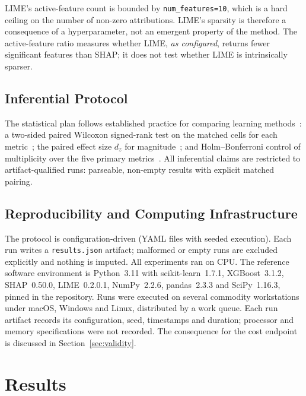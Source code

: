 \documentclass[11pt,a4paper]{article}
\begin{document}
LIME's active-feature count is bounded by \texttt{num\_features=10}, which
is a hard ceiling on the number of non-zero attributions. LIME's sparsity
is therefore a consequence of a hyperparameter, not an emergent property of
the method. The active-feature ratio measures whether LIME, \emph{as
configured}, returns fewer significant features than SHAP; it does not test
whether LIME is intrinsically sparser.

\subsection{Inferential Protocol}
\label{sec:inference}

The statistical plan follows established practice for comparing learning
methods~\cite{demsar2006statistical}: a two-sided paired Wilcoxon
signed-rank test on the matched cells for each
metric~\cite{wilcoxon1945individual}; the paired effect size $d_z$ for
magnitude~\cite{lakens2013calculating}; and Holm--Bonferroni control of
multiplicity over the five primary metrics~\cite{holm1979simple}. All
inferential claims are restricted to artifact-qualified runs: parseable,
non-empty results with explicit matched pairing.

\subsection{Reproducibility and Computing Infrastructure}
\label{sec:infrastructure}

The protocol is configuration-driven (YAML files with seeded execution).
Each run writes a \texttt{results.json} artifact; malformed or empty runs
are excluded explicitly and nothing is imputed. All experiments ran on CPU.
The reference software environment is Python~3.11 with scikit-learn~1.7.1,
XGBoost~3.1.2, SHAP~0.50.0, LIME~0.2.0.1, NumPy~2.2.6, pandas~2.3.3 and
SciPy~1.16.3, pinned in the repository. Runs were executed on several
commodity workstations under macOS, Windows and Linux, distributed by a
work queue. Each run artifact records its configuration, seed, timestamps
and duration; processor and memory specifications were not recorded. The
consequence for the cost endpoint is discussed in
Section~\ref{sec:validity}.

\section{Results}
\label{sec:results}
\end{document}
